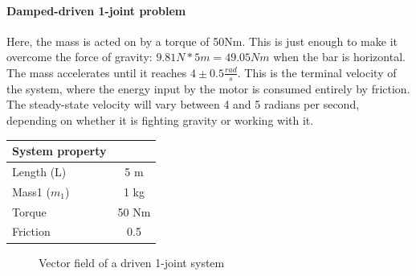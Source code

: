 \documentclass{article}
\begin{document}
\paragraph{Damped-driven 1-joint problem}
Here, the mass is acted on by a torque of 50Nm. This is just enough to make it overcome the force of gravity: $9.81N * 5m = 49.05Nm$ when the bar is horizontal. The mass accelerates until it reaches $4\pm0.5\frac{rad}{s}$. This is the terminal velocity of the system, where the energy input by the motor is consumed entirely by friction. The steady-state velocity will vary between 4 and 5 radians per second, depending on whether it is fighting gravity or working with it. 
\begin{table}[h]
\centering
\begin{tabular}{|l|c|}
\hline
System property & \\
\hline
Length (L) & 5 m \\
Mass1 ($m_1$) & 1 kg \\
Torque & 50 Nm \\
Friction & 0.5 \\
\hline
\end{tabular}
\label{tab:quantities}
\end{table}
\begin{figure}[!h]
  \caption{Vector field of a driven 1-joint system}
  \label{fig:key}
\end{figure}

\newpage
\end{document}
